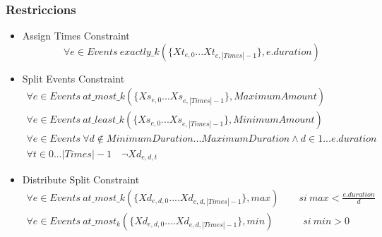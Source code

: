 \documentclass[11pt]{beamer}
\begin{document}
  
  \begin{frame}
    \frametitle{Restriccions}

    \begin{itemize}
      \item Assign Times Constraint \[
        \forall e \in Events \ exactly\_k(\{Xt_{e,0} ... Xt_{e,|Times|-1}\}, e.duration)
      \]
      \item Split Events Constraint
      \begin{gather*}
        \forall e \in Events \ at\_most\_k(\{Xs_{e,0} . . . Xs_{e,|Times|-1}\}, MaximumAmount)\\
        \forall e \in Events \ at\_least\_k(\{Xs_{e,0} . . . Xs_{e,|Times|-1}\}, MinimumAmount)\\
        \forall e \in Events \ \forall d \notin MinimumDuration...MaximumDuration \land d \in 1 ... e.duration  \\
        \forall t \in 0...|Times|-1 \quad \neg Xd_{e,d,t}
      \end{gather*}
      \item Distribute Split Constraint
      \begin{gather*}
      \forall e \in Events \ at\_most\_k(\{Xd_{e,d,0} .... Xd_{e,d,|Times|-1}\}, max) \quad \quad si \ max<\frac{e.duration}{d}\\
      \forall e \in Events \ at\_most_k(\{Xd_{e,d,0} .... Xd_{e,d,|Times|-1}\}, min) \quad \quad \quad si \ min>0\\
      \end{gather*}
    \end{itemize}
  
  \end{frame} 
\end{document}
